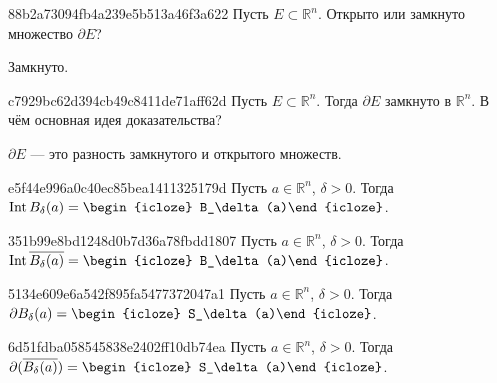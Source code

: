 \begin{note}{88b2a73094fb4a239e5b513a46f3a622}
    Пусть \({ E \subset \mathbb R^{n} }\).
    Открыто или замкнуто множество \({ \partial E }\)?

    \begin{cloze}{1}
        Замкнуто.
    \end{cloze}
\end{note}

\begin{note}{c7929bc62d394cb49c8411de71aff62d}
    Пусть \({ E \subset \mathbb R^{n} }\).
    Тогда \({ \partial E }\) замкнуто в \({ \mathbb R^{n} }\).
    В чём основная идея доказательства?

    \begin{cloze}{1}
        \({ \partial E }\) --- это разность замкнутого и открытого множеств.
    \end{cloze}
\end{note}

\begin{note}{e5f44e996a0c40ec85bea1411325179d}
    Пусть \({ a \in \mathbb R^{n} }\),\: \({ \delta > 0 }\).
    Тогда \({ \operatorname{Int} B_\delta (a) = \begin{icloze}{1}B_\delta (a)\end{icloze} }\).
\end{note}

\begin{note}{351b99e8bd1248d0b7d36a78fbdd1807}
    Пусть \({ a \in \mathbb R^{n} }\),\: \({ \delta > 0 }\).
    Тогда \({ \operatorname{Int} \overline{B_\delta (a)} = \begin{icloze}{1}B_\delta(a)\end{icloze} }\).
\end{note}

\begin{note}{5134e609e6a542f895fa5477372047a1}
    Пусть \({ a \in \mathbb R^{n} }\),\: \({ \delta > 0 }\).
    Тогда \({ \partial B_\delta(a) = \begin{icloze}{1}S_\delta(a)\end{icloze} }\).
\end{note}

\begin{note}{6d51fdba058545838e2402ff10db74ea}
    Пусть \({ a \in \mathbb R^{n} }\),\: \({ \delta > 0 }\).
    Тогда \({ \partial(\overline{B_\delta(a)}) = \begin{icloze}{1}S_\delta(a)\end{icloze} }\).
\end{note}

